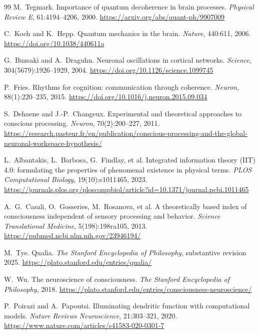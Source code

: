 \documentclass[11pt]{article}
\theoremstyle{remark}
\theoremstyle{plain}
\begin{document}
\begin{thebibliography}{99}
M.\ Tegmark.
\newblock Importance of quantum decoherence in brain processes.
\newblock \emph{Physical Review E}, 61:4194--4206, 2000.
\newblock \url{https://arxiv.org/abs/quant-ph/9907009}

C.\ Koch and K.\ Hepp.
\newblock Quantum mechanics in the brain.
\newblock \emph{Nature}, 440:611, 2006.
\newblock \url{https://doi.org/10.1038/440611a}

G.\ Buzsaki and A.\ Draguhn.
\newblock Neuronal oscillations in cortical networks.
\newblock \emph{Science}, 304(5679):1926--1929, 2004.
\newblock \url{https://doi.org/10.1126/science.1099745}

P.\ Fries.
\newblock Rhythms for cognition: communication through coherence.
\newblock \emph{Neuron}, 88(1):220--235, 2015.
\newblock \url{https://doi.org/10.1016/j.neuron.2015.09.034}

S.\ Dehaene and J.-P.\ Changeux.
\newblock Experimental and theoretical approaches to conscious processing.
\newblock \emph{Neuron}, 70(2):200--227, 2011.
\newblock \url{https://research.pasteur.fr/en/publication/conscious-processing-and-the-global-neuronal-workspace-hypothesis/}

L.\ Albantakis, L.\ Barbosa, G.\ Findlay, et al.
\newblock Integrated information theory (IIT) 4.0: formulating the properties of phenomenal existence in physical terms.
\newblock \emph{PLOS Computational Biology}, 19(10):e1011465, 2023.
\newblock \url{https://journals.plos.org/ploscompbiol/article?id=10.1371/journal.pcbi.1011465}

A.\ G.\ Casali, O.\ Gosseries, M.\ Rosanova, et al.
\newblock A theoretically based index of consciousness independent of sensory processing and behavior.
\newblock \emph{Science Translational Medicine}, 5(198):198ra105, 2013.
\newblock \url{https://pubmed.ncbi.nlm.nih.gov/23946194/}

M.\ Tye.
\newblock Qualia.
\newblock \emph{The Stanford Encyclopedia of Philosophy}, substantive revision 2025.
\newblock \url{https://plato.stanford.edu/entries/qualia/}

W.\ Wu.
\newblock The neuroscience of consciousness.
\newblock \emph{The Stanford Encyclopedia of Philosophy}, 2018.
\newblock \url{https://plato.stanford.edu/entries/consciousness-neuroscience/}

P.\ Poirazi and A.\ Papoutsi.
\newblock Illuminating dendritic function with computational models.
\newblock \emph{Nature Reviews Neuroscience}, 21:303--321, 2020.
\newblock \url{https://www.nature.com/articles/s41583-020-0301-7}


\end{thebibliography}
\end{document}
